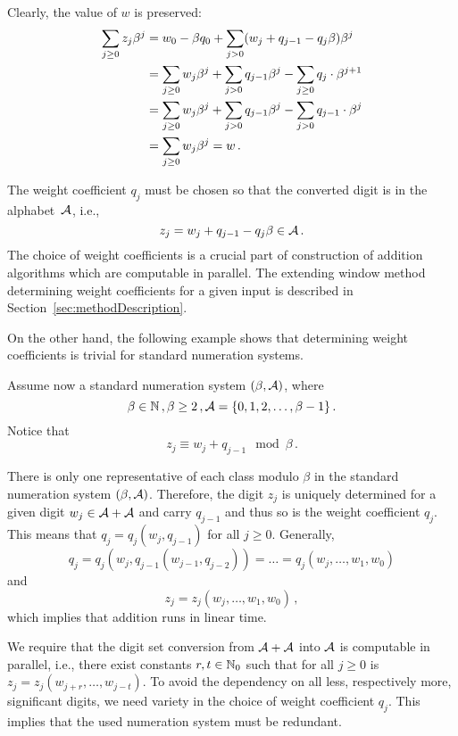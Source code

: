     \begin{upravit} 
     Clearly, the value of $w$ is preserved:
\begin{align}
\label{eq:valuePreserving}
    \sum_{j\geq 0} z_j \beta^j &=w_0 - \beta q_0 + \sum_{j> 0} (w_j + q_{j-1} - q_j \beta) \beta^j \notag\\
    &=\sum_{j\geq 0} w_j \beta^j + \sum_{j>0} q_{j-1} \beta^j - \sum_{j\geq 0} q_j \cdot \beta^{j+1}  \\
    &=\sum_{j\geq 0} w_j \beta^j + \sum_{j>0} q_{j-1} \beta^j - \sum_{j> 0} q_{j-1} \cdot \beta^j \notag\\
    &=\sum_{j\geq 0} w_j \beta^j = w\,. \notag
\end{align}

     The weight coefficient $q_j$ must be chosen so that the converted digit is in the alphabet~$\mathcal{A}$, i.e., 
    \begin{equation}
    \label{eq:conversionFormula}
        z_j=w_j + q_{j-1} - q_j \beta \in \mathcal{A}\,.
    \end{equation} 
    The choice of weight coefficients is a crucial part of construction of addition algorithms which are computable in parallel. The extending window method determining weight coefficients for a given input is described in Section~\ref{sec:methodDescription}.
    
    
     On the other hand, the following example shows that determining weight coefficients is trivial for standard numeration systems.
     
     \begin{exmp}
        Assume now a standard numeration system $(\beta, \mathcal{A})$, where
  $$
    \beta \in \mathbb{N}\,,\beta  \geq 2\,, \mathcal{A} = \{0, 1, 2,\dots, \beta -1 \}\,.
  $$ 
       Notice that
    $$
        z_j \equiv w_j+q_{j-1} \mod \beta\,. 
    $$
  
  There is only one representative of each class modulo  $\beta$ in the standard numeration system $(\beta, \mathcal{A})$. Therefore, the digit $z_j$ is uniquely determined for a given digit $w_j \in \mathcal{A}+\mathcal{A}$ and carry $q_{j-1}$ and thus so is the weight coefficient $q_j$. This means that $q_j=q_j(w_j,q_{j-1})$ for all $j\geq 0$. Generally,
  $$
  q_j=q_j(w_j,q_{j-1}(w_{j-1},q_{j-2}))=\dots =q_j(w_j ,\dots , w_1, w_0)
  $$
  and
  $$
  z_j=z_j(w_j ,\dots , w_1, w_0)\,,
  $$
  which implies that addition runs in linear time.
     
     \end{exmp}
  
  We require that the digit set conversion from $\mathcal{A}+\mathcal{A}$ into $\mathcal{A}$ is computable in parallel, i.e., there exist constants $r,t \in \mathbb{N}_0$ such that for all $j\geq 0$ is $z_j=z_j(w_{j+r},\dots,w_{j-t})$. To avoid the dependency on all less, respectively more, significant digits, we need variety in the choice of weight coefficient $q_j$. This implies that the used numeration system must be redundant.
  


\end{upravit}
